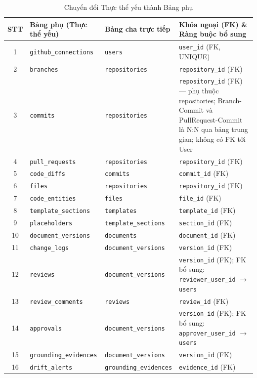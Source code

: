 \begin{longtable}{|c|p{3.8cm}|p{3.2cm}|p{5.5cm}|}
\caption{Chuyển đổi Thực thể yếu thành Bảng phụ} \\
\hline
\textbf{STT} & \textbf{Bảng phụ (Thực thể yếu)} & \textbf{Bảng cha trực tiếp} & \textbf{Khóa ngoại (FK) \& Ràng buộc bổ sung} \\ \hline
\endhead

1 & \texttt{github\_connections} & \texttt{users} & \texttt{user\_id} (FK, UNIQUE) \\ \hline
2 & \texttt{branches} & \texttt{repositories} & \texttt{repository\_id} (FK) \\ \hline
3 & \texttt{commits} & \texttt{repositories} & \texttt{repository\_id} (FK) --- phụ thuộc repositories; Branch-Commit và PullRequest-Commit là N:N qua bảng trung gian; không có FK tới User \\ \hline
4 & \texttt{pull\_requests} & \texttt{repositories} & \texttt{repository\_id} (FK) \\ \hline
5 & \texttt{code\_diffs} & \texttt{commits} & \texttt{commit\_id} (FK) \\ \hline
6 & \texttt{files} & \texttt{repositories} & \texttt{repository\_id} (FK) \\ \hline
7 & \texttt{code\_entities} & \texttt{files} & \texttt{file\_id} (FK) \\ \hline
8 & \texttt{template\_sections} & \texttt{templates} & \texttt{template\_id} (FK) \\ \hline
9 & \texttt{placeholders} & \texttt{template\_sections} & \texttt{section\_id} (FK) \\ \hline
10 & \texttt{document\_versions} & \texttt{documents} & \texttt{document\_id} (FK) \\ \hline
11 & \texttt{change\_logs} & \texttt{document\_versions} & \texttt{version\_id} (FK) \\ \hline
12 & \texttt{reviews} & \texttt{document\_versions} & \texttt{version\_id} (FK); FK bổ sung: \texttt{reviewer\_user\_id} $\rightarrow$ \texttt{users} \\ \hline
13 & \texttt{review\_comments} & \texttt{reviews} & \texttt{review\_id} (FK) \\ \hline
14 & \texttt{approvals} & \texttt{document\_versions} & \texttt{version\_id} (FK); FK bổ sung: \texttt{approver\_user\_id} $\rightarrow$ \texttt{users} \\ \hline
15 & \texttt{grounding\_evidences} & \texttt{document\_versions} & \texttt{version\_id} (FK) \\ \hline
16 & \texttt{drift\_alerts} & \texttt{grounding\_evidences} & \texttt{evidence\_id} (FK) \\ \hline
\end{longtable}

